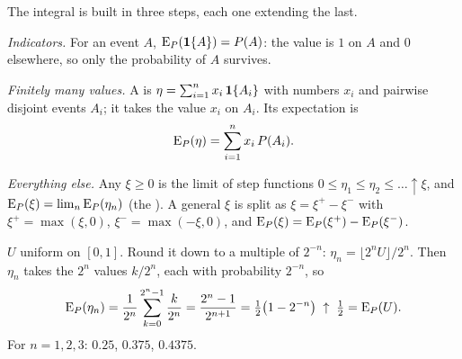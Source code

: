 The integral is built in three steps, each one extending the last.

\begin{steps}
  \item \emph{Indicators.} For an event $A$, $\operatorname{E}_P(\mathbf{1}\{A\})=P(A)$: the value is $1$ on $A$ and $0$ elsewhere, so only the probability of $A$ survives.
  \item \emph{Finitely many values.} A  is $\eta=\sum_{i=1}^n x_i\,\mathbf{1}\{A_i\}$ with numbers $x_i$ and pairwise disjoint events $A_i$; it takes the value $x_i$ on $A_i$. Its expectation is
  \[
    \operatorname{E}_P(\eta)=\sum_{i=1}^n x_i\,P(A_i).
  \]
  \item \emph{Everything else.} Any $\xi\ge0$ is the limit of step functions $0\le\eta_1\le\eta_2\le\dots\uparrow\xi$, and $\operatorname{E}_P(\xi)=\lim_n\operatorname{E}_P(\eta_n)$ (the ). A general $\xi$ is split as $\xi=\xi^+-\xi^-$ with $\xi^+=\max(\xi,0)$, $\xi^-=\max(-\xi,0)$, and $\operatorname{E}_P(\xi)=\operatorname{E}_P(\xi^+)-\operatorname{E}_P(\xi^-)$.
\end{steps}

\begin{example}
\label{ex:dyadic}
$U$ uniform on $[0,1]$. Round it down to a multiple of $2^{-n}$: $\eta_n=\lfloor2^nU\rfloor/2^n$. Then $\eta_n$ takes the $2^n$ values $k/2^n$, each with probability $2^{-n}$, so
\[
  \operatorname{E}_P(\eta_n)=\frac{1}{2^n}\sum_{k=0}^{2^n-1}\frac{k}{2^n}=\frac{2^n-1}{2^{n+1}}=\tfrac12\big(1-2^{-n}\big)\;\uparrow\;\tfrac12=\operatorname{E}_P(U).
\]
For $n=1,2,3$: $0.25$, $0.375$, $0.4375$.
\end{example}

\begin{pic}
\end{pic}

